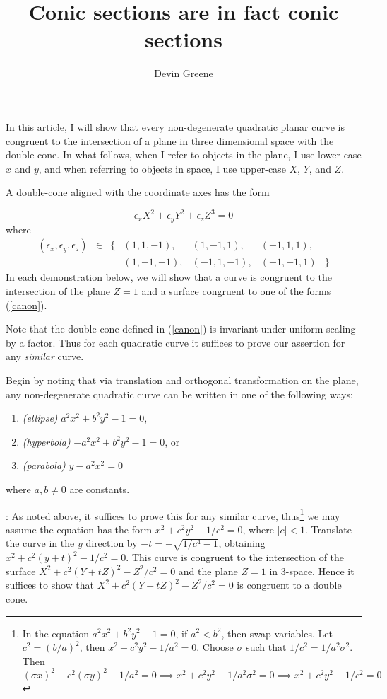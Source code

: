 \documentclass[12pt]{article}
\title{Conic sections are in fact conic sections}
\author{Devin Greene}
\date{}
\newcommand{\eps}{\epsilon}
\begin{document}
\maketitle

In this article, I will show that every non-degenerate quadratic
planar curve is congruent to the intersection of a plane in three
dimensional space with the double-cone.  In what follows, when I 
refer to objects in the plane, I use lower-case $x$ and $y$, and
when referring to objects in space, I use upper-case $X$, $Y$, and
$Z$.

A double-cone aligned with the coordinate axes has the form 

\begin{equation} \label{canon} \eps_x X^2 + \eps_y Y^2 + \eps_z
Z^3 = 0\end{equation}
where
$$\begin{matrix}(\eps_x,\eps_y,\eps_z) & \in  &
\{ &(1,1,-1),&(1,-1,1),&(-1,1,1), &\\
&&&(1,-1,-1),&(-1,1,-1),&(-1,-1,1) &\}\end{matrix}$$
In each demonstration below, we will show that a curve is congruent to
the intersection of the plane $Z = 1$ and a surface congruent to one
of the forms (\ref{canon}).

Note that the double-cone defined in (\ref{canon}) is invariant under
uniform scaling by a factor.  Thus for each quadratic curve it
suffices to prove our assertion for any {\it similar} curve.

Begin by noting that via translation and orthogonal transformation on
the plane, any non-degenerate quadratic curve can be written in one of
the following ways:

\begin{enumerate}
\item {\it (ellipse)} $a^2x^2 + b^2y^2 - 1 = 0$,
\item {\it (hyperbola)} $-a^2x^2 + b^2y^2 - 1 = 0$, or
\item {\it (parabola)} $y - a^2x^2 = 0$
\end{enumerate}
where $a,b \neq 0$ are constants.

\medskip

: As noted above, it suffices to prove this for
any similar curve, thus\footnote{
In the equation $a^2x^2 + b^2y^2 - 1 = 0$, if $a^2 < b^2$, then swap
variables.  Let $c^2 = (b/a)^2$, then $x^2 + c^2 y^2 - 1/a^2 = 0$.
Choose $\sigma$ such that $1/c^2 = 1/a^2\sigma^2$.  Then
$(\sigma x)^2
+ c^2 (\sigma y)^2 - 1/a^2 = 0 \implies x^2  + c^2 y^2 - 1/a^2\sigma^2
= 0 \implies x^2 + c^2 y^2 - 1/c^2 = 0$
}
we may assume the
equation has the form $x^2 + c^2 y^2 - 1/c^2 = 0$, where $|c| < 1$. Translate the curve in the $y$ direction by $-t = -\sqrt{1/c^4 - 1}$,
obtaining $x^2 + c^2 (y + t)^2 - 1/c^2 = 0$.  This curve is congruent to
the intersection of the surface $X^2 + c^2 (Y + tZ)^2 - Z^2/c^2 = 0$ and
the plane $Z = 1$ in 3-space.  Hence it suffices to show that $ X^2 +
c^2 (Y + tZ)^2 - Z^2/c^2 = 0$ is congruent to a double cone.
\end{document}
